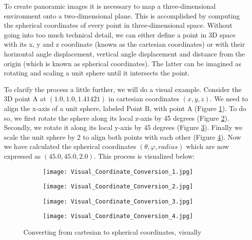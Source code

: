To create panoramic images it is necessary to map a three-dimensional environment onto a two-dimensional plane. This is accomplished by computing the spherical coordinates of every point in three-dimensional space. Without going into too much technical detail, we can either define a point in 3D space with its x, y and z coordinate (known as the cartesian coordinates) or with their horizontal angle displacement, vertical angle displacement and distance from the origin (which is known as spherical coordinates). The latter can be imagined as rotating and scaling a unit sphere until it intersects the point.

To clarify the process a little further, we will do a visual example. Consider the 3D point A at {$(1.0, 1.0, 1.41421)$}  in cartesian coordinates {$(x, y, z)$}. We need to align the x-axis of a unit sphere, labeled Point B, with point A (Figure \ref{fig:visual_coordinate_conversion_1}). To do so, we first rotate the sphere along its local z-axis by 45 degrees (Figure \ref{fig:visual_coordinate_conversion_2}). Secondly, we rotate it along its local y-axis by 45 degrees (Figure \ref{fig:visual_coordinate_conversion_3}). Finally we scale the unit sphere by 2 to align both points with each other (Figure \ref{fig:visual_coordinate_conversion_4}). Now we have calculated the spherical coordinates {$(\theta, \varphi, radius)$} which are now expressed as {$(45.0, 45.0, 2.0)$}. This process is visualized below:

\begin{figure}[h]
	\centering
	\begin{subfigure}[b]{0.24\textwidth}
		\centering
		\texttt{[image: Visual\_Coordinate\_Conversion\_1.jpg]}
		\caption{}
		\label{fig:visual_coordinate_conversion_1}
	\end{subfigure}
	\hfill
	\begin{subfigure}[b]{0.24\textwidth}
		\centering
		\texttt{[image: Visual\_Coordinate\_Conversion\_2.jpg]}
		\caption{}
		\label{fig:visual_coordinate_conversion_2}
	\end{subfigure}
	\hfill
	\begin{subfigure}[b]{0.24\textwidth}
		\centering
		\texttt{[image: Visual\_Coordinate\_Conversion\_3.jpg]}
		\caption{}
		\label{fig:visual_coordinate_conversion_3}
	\end{subfigure}
	\hfill
	\begin{subfigure}[b]{0.24\textwidth}
		\centering
		\texttt{[image: Visual\_Coordinate\_Conversion\_4.jpg]}
		\caption{}
		\label{fig:visual_coordinate_conversion_4}
	\end{subfigure}
	
	\caption{Converting from cartesian to spherical coordinates, visually}
	\label{fig:converting_cartesian_to_spherical}
\end{figure}

